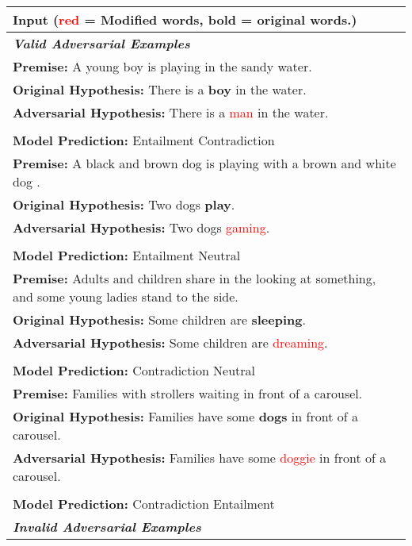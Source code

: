 \documentclass{article} \usepackage{iclr2021_conference,times}
\theoremstyle{definition}
\theoremstyle{remark}
\begin{document}
\begin{table}[htp!]\small \setlength{\tabcolsep}{7pt}
\centering
\begin{tabular}{p{13.8cm}}
\toprule Input (\textcolor{red}{red} = Modified words, \textbf{bold} = original words.) \\
\midrule
\midrule
\textbf{\textit{Valid Adversarial Examples} }\\
\midrule 

\textbf{Premise:} A young boy is playing in the sandy water.\\
\textbf{Original Hypothesis: } There is a \textbf{boy} in the water. \\
\textbf{Adversarial Hypothesis: } There is a \textcolor{red}{man} in the water. \\
\\
\textbf{Model Prediction: } Entailment  Contradiction \\
\midrule

\textbf{Premise:} A black and brown dog is playing with a brown and white dog .\\
\textbf{Original Hypothesis: } Two dogs \textbf{play}. \\
\textbf{Adversarial Hypothesis: } Two dogs \textcolor{red}{gaming}. \\
\\
\textbf{Model Prediction: } Entailment  Neutral \\
\midrule

\textbf{Premise:} Adults and children share in the looking at something, and some young ladies stand to the side.\\
\textbf{Original Hypothesis: } Some children are \textbf{sleeping}. \\
\textbf{Adversarial Hypothesis: } Some children are \textcolor{red}{dreaming}. \\
\\
\textbf{Model Prediction: } Contradiction  Neutral \\
\midrule

\textbf{Premise:} Families with strollers waiting in front of a carousel.\\
\textbf{Original Hypothesis: } Families have some \textbf{dogs} in front of a carousel. \\
\textbf{Adversarial Hypothesis: } Families have some \textcolor{red}{doggie} in front of a carousel. \\
\\
\textbf{Model Prediction: } Contradiction  Entailment \\
\midrule 
\midrule 
\textbf{\textit{Invalid Adversarial Examples }}\\
\midrule 


\end{tabular}
\end{table}
\end{document}
